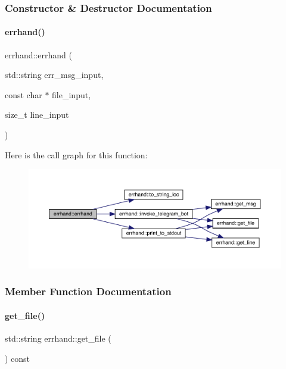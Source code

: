 \subsubsection{Constructor \& Destructor Documentation}
\mbox{\label{classerrhand_a69afd61e0ebf5ee9d35f297dc2d5c086}} 
\paragraph{\texorpdfstring{errhand()}{errhand()}}
{\footnotesize\ttfamily errhand\+::errhand (\begin{DoxyParamCaption}\item[{std\+::string}]{err\+\_\+msg\+\_\+input,  }\item[{const char $\ast$}]{file\+\_\+input,  }\item[{size\+\_\+t}]{line\+\_\+input }\end{DoxyParamCaption})\hspace{0.3cm}{\ttfamily [inline]}}

Here is the call graph for this function\+:\nopagebreak
\begin{figure}[H]
\begin{center}
\leavevmode
\includegraphics[width=350pt]{classerrhand_a69afd61e0ebf5ee9d35f297dc2d5c086_cgraph}
\end{center}
\end{figure}


\subsubsection{Member Function Documentation}
\mbox{\label{classerrhand_a1556ee8d0aaefeea3bbab73f7ae50914}} 
\paragraph{\texorpdfstring{get\+\_\+file()}{get\_file()}}
{\footnotesize\ttfamily std\+::string errhand\+::get\+\_\+file (\begin{DoxyParamCaption}{ }\end{DoxyParamCaption}) const\hspace{0.3cm}{\ttfamily [inline]}}

